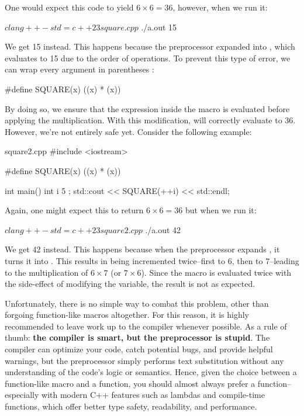 \documentclass[12pt]{article}
\begin{document}
\noindent
One would expect this code to yield $6 \times 6 = 36$, however, when we run it:

\begin{terminal}
$ clang++ -std=c++23 square.cpp
$ ./a.out
15
\end{terminal}

\noindent
We get 15 instead.
This happens because the preprocessor expanded  into , which evaluates to 15 due to the order of operations.
To prevent this type of error, we can wrap every argument in parentheses \inlinecxx{()}:

\begin{cxx}{}
#define SQUARE(x) ((x) * (x))
\end{cxx}

\noindent
By doing so, we ensure that the expression inside the macro is evaluated before applying the multiplication.
With this modification,  will correctly evaluate to 36.
However, we're not entirely safe yet.
Consider the following example:

\begin{cxx}{square2.cpp}
#include <iostream>

#define SQUARE(x) ((x) * (x))

int main()
{
	int i { 5 };
	std::cout << SQUARE(++i) << std::endl;
}
\end{cxx}

\noindent
Again, one might expect this to return $6\times 6 = 36$ but when we run it:

\begin{terminal}
$ clang++ -std=c++23 square2.cpp
$ ./a.out
42
\end{terminal}

\noindent
We get 42 instead.
This happens because when the preprocessor expands , it turns it into .
This results in  being incremented twice--first to 6, then to 7--leading to the multiplication of $6 \times 7$ (or $7 \times 6$).
Since the macro is evaluated twice with the side-effect of modifying the variable, the result is not as expected.

\begin{advice}
\noindent
Unfortunately, there is no simple way to combat this problem, other than forgoing function-like macros altogether.
For this reason, it is highly recommended to leave work up to the compiler whenever possible.
As a rule of thumb: \textbf{the compiler is smart, but the preprocessor is stupid}.
The compiler can optimize your code, catch potential bugs, and provide helpful warnings, but the preprocessor simply performs text substitution without any understanding of the code's logic or semantics.
Hence, given the choice between a function-like macro and a function, you should almost always prefer a function--especially with modern C++ features such as lambdas and compile-time functions, which offer better type safety, readability, and performance.
\end{advice}
\end{document}
